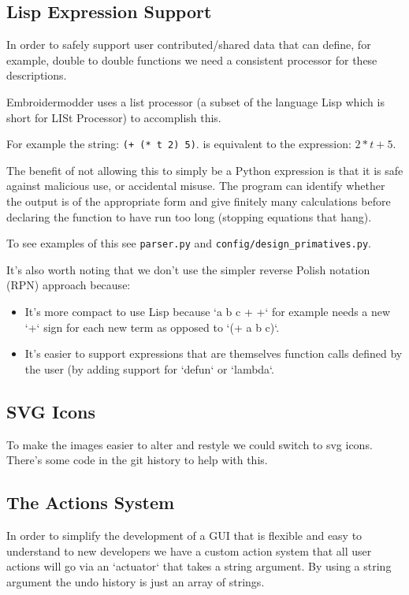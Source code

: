 \documentclass[a4paper]{report}
\begin{document}
\subsection{Lisp Expression Support}

In order to safely support user contributed/shared data that can
define, for example, double to double functions we need a consistent
processor for these descriptions.

Embroidermodder uses a list processor (a subset of the language
Lisp which is short for LISt Processor) to accomplish this.

For example the string: \texttt{(+ (* t 2) 5)}.
is equivalent to the expression: $2*t + 5$.

The benefit of not allowing this to simply be a Python expression
is that it is safe against malicious use, or accidental misuse.
The program can identify whether the output is of the appropriate
form and give finitely many calculations before declaring the
function to have run too long (stopping equations that hang).

To see examples of this see \texttt{parser.py} and
\texttt{config/design\_primatives.py}.

It's also worth noting that we don't use the simpler reverse Polish
notation (RPN) approach because:

\begin{itemize}
\item It's more compact to use Lisp because `a b c + +` for example needs a new `+` sign for each new term as opposed to `(+ a b c)`.
\item It's easier to support expressions that are themselves function calls defined by the user (by adding support for `defun` or `lambda`.
\end{itemize}

\subsection{SVG Icons}

To make the images easier to alter and restyle we could
switch to svg icons. There's some code in the git history
to help with this.

\subsection{The Actions System}

In order to simplify the development of a GUI that is flexible and
easy to understand to new developers we have a custom action system that all
user actions will go via an `actuator` that takes a string argument. By using a
string argument the undo history is just an array of strings.
\end{document}
